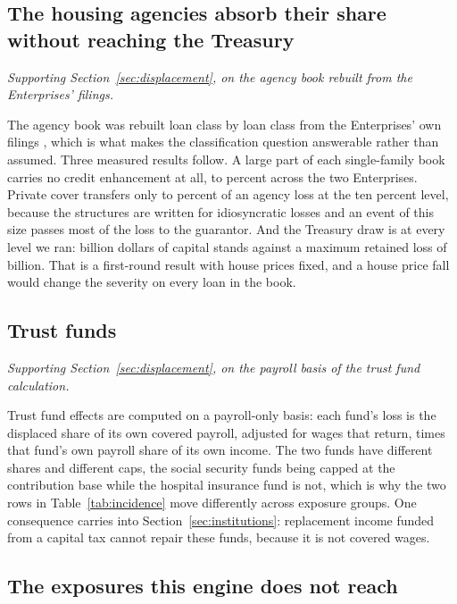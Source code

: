 \subsection{The housing agencies absorb their share without reaching the Treasury}

\emph{Supporting Section~\ref{sec:displacement}, on the agency book rebuilt from the Enterprises' filings.}

The agency book was rebuilt loan class by loan class from the Enterprises' own filings
\citep{FannieMae10K2025,FreddieMac10K2025}, which is what makes the classification question
answerable rather than assumed. Three measured results follow. A large part of each single-family
book carries no credit enhancement at all,  to 
percent across the two Enterprises. Private cover transfers only  to
 percent of an agency loss at the ten percent level, because the
structures are written for idiosyncratic losses and an event of this size passes most of the loss
to the guarantor. And the Treasury draw is  at every level we ran:
 billion dollars of capital stands against a maximum retained loss of
 billion. That is a first-round result with house prices fixed,
and a house price fall would change the severity on every loan in the book.

\subsection{Trust funds}

\emph{Supporting Section~\ref{sec:displacement}, on the payroll basis of the trust fund calculation.}

Trust fund effects are computed on a payroll-only basis: each fund's loss is the displaced share
of its own covered payroll, adjusted for wages that return, times that fund's own payroll share of
its own income. The two funds have different shares and different caps, the social security funds
being capped at the contribution base while the hospital insurance fund is not, which is why the
two rows in Table~\ref{tab:incidence} move differently across exposure groups. One consequence
carries into Section~\ref{sec:institutions}: replacement income funded from a capital tax cannot
repair these funds, because it is not covered wages.

\subsection{The exposures this engine does not reach}

